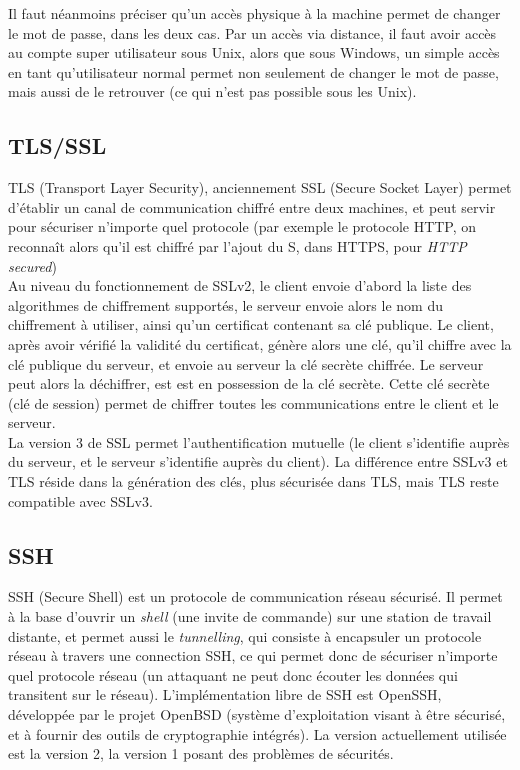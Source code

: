 Il faut néanmoins préciser qu'un accès physique à la machine
permet de changer le mot de passe, dans les deux cas. Par un accès
via distance, il faut avoir accès au compte super utilisateur sous
Unix, alors que sous Windows, un simple accès en tant
qu'utilisateur normal permet non seulement de changer le mot de
passe, mais aussi de le retrouver (ce qui n'est pas possible sous
les Unix).
\subsection{TLS/SSL}
TLS (Transport Layer Security), anciennement SSL (Secure Socket
Layer) permet d'établir un canal de communication chiffré entre
deux machines, et peut servir pour sécuriser n'importe quel
protocole (par exemple le protocole HTTP, on reconnaît alors qu'il
est chiffré par l'ajout du S, dans HTTPS, pour \emph{HTTP
secured})
\\
 
Au niveau du fonctionnement de SSLv2, le client envoie d'abord la liste des
algorithmes de chiffrement supportés, le serveur envoie alors le
nom du chiffrement à utiliser, ainsi qu'un
certificat contenant sa clé publique. Le client, après avoir
vérifié la validité du certificat, génère alors une clé, qu'il
chiffre avec la clé publique du serveur, et envoie au serveur la
clé secrète chiffrée. Le serveur peut alors la déchiffrer, est est
en possession de la clé secrète.
Cette clé secrète (clé de session) permet de chiffrer toutes les
communications entre le client et le serveur.
\\

La version 3 de SSL permet l'authentification mutuelle (le client
s'identifie auprès du serveur, et le serveur s'identifie auprès du
client). La différence entre SSLv3 et TLS réside dans la
génération des clés, plus sécurisée dans TLS, mais TLS reste
compatible avec SSLv3.

\subsection{SSH}
SSH (Secure Shell) est un protocole de communication réseau
sécurisé. Il permet à la base d'ouvrir un \emph{shell} (une invite
de commande) sur une station de travail distante, et permet aussi
le \emph{tunnelling}, qui consiste à encapsuler un protocole
réseau à travers une connection SSH, ce qui permet donc de
sécuriser n'importe quel protocole réseau (un attaquant ne peut
donc écouter les données qui transitent sur le réseau).
L'implémentation libre de SSH est OpenSSH, développée par le
projet OpenBSD (système d'exploitation visant à être sécurisé, et
à fournir des outils de cryptographie intégrés). La version
actuellement utilisée est la version 2, la version 1 posant des
problèmes de sécurités.
\\

